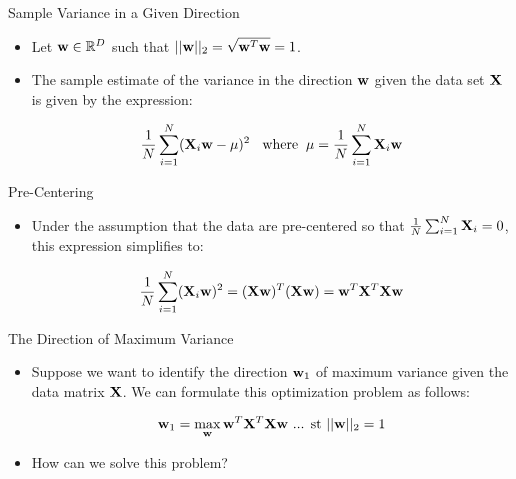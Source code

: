 \documentclass[serif,xcolor=pdftex,dvipsnames,table,hyperref={bookmarks=false,breaklinks}]{beamer}
\begin{document}
\begin{frame}[t]{Sample Variance in a Given Direction}

\begin{itemize}
\item Let ${\mathbf{w}}\in \mathbb{R}^{D}$ such that 
$||{\mathbf{w}}||_2=\sqrt{{\mathbf{w}}^T{\mathbf{w}}}=1$. 

\pause\item The sample estimate of the variance in the direction 
${\mathbf{w}}$ given the data set ${\mathbf{X}}$ is given by the expression:

$$ \frac{1}{N}\sum_{i=1}^N ({\mathbf{X}}_i{\mathbf{w}}-\mu)^2 \;\;\mbox{ where} \;\;
\mu = \frac{1}{N}\sum_{i=1}^N {\mathbf{X}}_i{\mathbf{w}}$$ 

\end{itemize} 
\end{frame}

\begin{frame}[t]{Pre-Centering}

\begin{itemize}
\item Under the assumption that the data are 
pre-centered so that $\frac{1}{N}\sum_{i=1}^N {\mathbf{X}}_i=0$, this expression 
simplifies to:

\begin{align*}
\frac{1}{N}\sum_{i=1}^N ({\mathbf{X}}_i{\mathbf{w}})^2 
= ({\mathbf{X}}{\mathbf{w}})^T({\mathbf{X}}{\mathbf{w}}) 
= {\mathbf{w}}^T{\mathbf{X}}^T{\mathbf{X}}{\mathbf{w}}
\end{align*}

\end{itemize} 
\end{frame}

\begin{frame}[t]{The Direction of Maximum Variance}

\begin{itemize}
\item Suppose we want to identify the direction ${\mathbf{w}}_1$ of maximum variance 
given the data matrix ${\mathbf{X}}$. We can formulate this optimization problem as 
follows:

\pause
\begin{align*}
{\mathbf{w}}_1 = \max_{{\mathbf{w}}} {\mathbf{w}}^T{\mathbf{X}}^T{\mathbf{X}}{\mathbf{w}} \mbox{ ... st } 
||{\mathbf{w}}||_2=1
\end{align*}

\pause\item How can we solve this problem?

\end{itemize} 
\end{frame}
\end{document}
